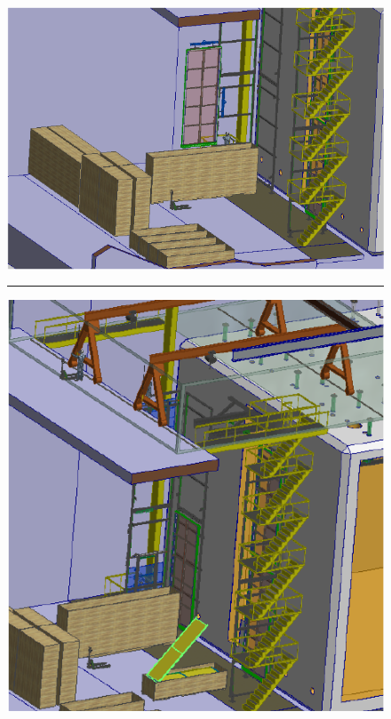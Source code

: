 \begin{figure}[!htb]
\begin{center}
\begin{minipage}[c]{0.32\textwidth}
\includegraphics[width=\textwidth]{far-detector-single-phase/figures/APA-3.pdf}
\end{minipage}
%
\vspace{5mm}
\hrule
\vspace{5mm}
%
\begin{minipage}[c]{0.32\textwidth}
\includegraphics[width=\textwidth]{far-detector-single-phase/figures/CPA-1.pdf}
\end{minipage}

\end{center}
\end{figure}
